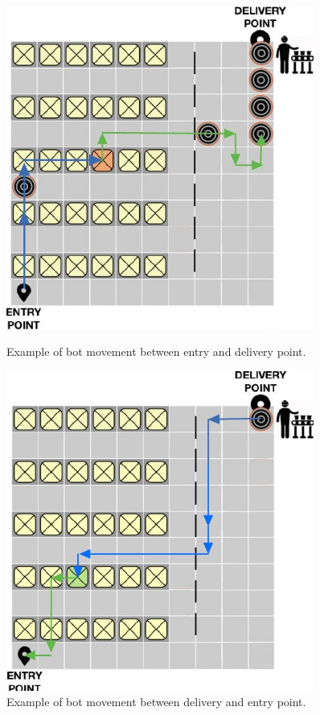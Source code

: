 \documentclass{article}
\begin{document}
				\begin{figure}[H]
					\centering
					\begin{minipage}{0.45\textwidth}
						\centering
						\includegraphics[width=0.9\textwidth]{./Images/BotMovement1.JPG}
						\caption{Example of bot movement between entry and delivery point.}
					\end{minipage}\hfill
					\begin{minipage}{0.45\textwidth}
						\centering
						\includegraphics[width=0.9\textwidth]{./Images/BotMovement2.JPG}
						\caption{Example of bot movement between delivery and entry point.}
					\end{minipage}
				\end{figure}
				
\end{document}
